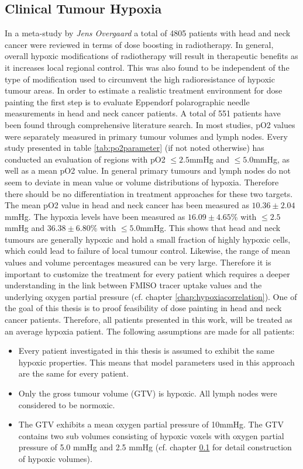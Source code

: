 \subsection{Clinical Tumour Hypoxia}\label{chap:tumourhypoxia}
In a meta-study by \textit{Jens Overgaard} \cite{pmid21511351} a total of 4805 patients with head and neck cancer were reviewed in terms of dose boosting in radiotherapy. In general, overall hypoxic modifications of radiotherapy will result in therapeutic benefits as it increases local regional control. This was also found to be independent of the type of modification used to circumvent the high radioresistance of hypoxic tumour areas. In order to estimate a realistic treatment environment for dose painting the first step is to evaluate Eppendorf polarographic needle measurements in head and neck cancer patients. A total of 551 patients have been found through comprehensive literature search. In most studies, pO2 values were separately measured in primary tumour volumes and lymph nodes. Every study presented in table \ref{tab:po2parameter} (if not noted otherwise) has conducted an evaluation of regions with pO2 $\leq 2.5$mmHg and $\leq 5.0$mmHg, as well as a mean pO2 value. In general primary tumours and lymph nodes do not seem to deviate in mean value or volume distributions of hypoxia. Therefore there should be no differentiation in treatment approaches for these two targets. The mean pO2 value in head and neck cancer has been measured as $10.36 \pm 2.04$ mmHg. The hypoxia levels have been measured as $16.09 \pm 4.65$\% with $\leq 2.5$mmHg and  $36.38 \pm 6.80$\% with $\leq 5.0$mmHg. This shows that head and neck tumours are generally hypoxic and hold a small fraction of highly hypoxic cells, which could lead to failure of local tumour control. Likewise, the range of mean values and volume percentages measured can be very large. Therefore it is important to customize the treatment for every patient which requires a deeper understanding in the link between FMISO tracer uptake values and the underlying oxygen partial pressure (cf. chapter \ref{chap:hypoxiacorrelation}). One of the goal of this thesis is to proof feasibility of dose painting in head and neck cancer patients. Therefore, all patients presented in this work, will be treated as an average hypoxia patient. The following assumptions are made for all patients:
\begin{itemize}
\item Every patient investigated in this thesis is assumed to exhibit the same hypoxic properties. This means that model parameters used in this approach are the same for every patient.
\item Only the gross tumour volume (GTV) is hypoxic. All lymph nodes were considered to be normoxic.
\item The GTV exhibits a mean oxygen partial pressure of 10mmHg. The GTV contains two sub volumes consisting of hypoxic voxels with oxygen partial pressure of 5.0 mmHg and 2.5 mmHg (cf. chapter \ref{chap:tumourhypoxia} for detail construction of hypoxic volumes).
\end{itemize}
